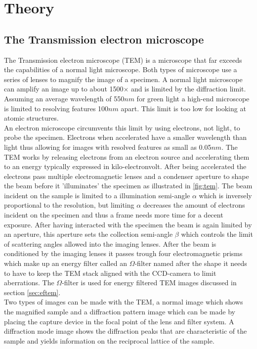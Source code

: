 \section{Theory}
\label{chap:theory}
\subsection{The Transmission electron microscope}
The Transmission electron microscope (TEM) is a microscope that far exceeds the capabilities of a normal light microscope. Both types of microscope use a series of lenses to magnify the image of a specimen.
A normal light microscope can amplify an image up to about 1500$\times$ and is limited by the diffraction limit. Assuming an average wavelength of 550$nm$ for green light a high-end microscope is limited to resolving features 100$nm$ apart.
This limit is too low for looking at atomic structures.\cite{PhysRevLett.106.193905}\\
An electron microscope circumvents this limit by using electrons, not light, to probe the specimen. Electrons when accelerated have a smaller wavelength than light thus allowing for images with resolved features as small as 0.05$nm$. \cite{kisielowski_freitag_bischoff_van}
The TEM works by releasing electrons from an electron source and accelerating them to an energy typically expressed in kilo-electronvolt. After being accelerated the electrons pass multiple electromagnetic lenses and a condenser aperture to shape the beam before it 'illuminates' the specimen as illustrated in \ref{fig:tem}.
The beam incident on the sample is limited to a illumination semi-angle $\alpha$ which is inversely proportional to the resolution, but limiting $\alpha$ decreases the amount of electrons incident on the specimen and thus a frame needs more time for a decent exposure.
After having interacted with the specimen the beam is again limited by an aperture, this aperture sets the collection semi-angle $\beta$ which controls the limit of scattering angles allowed into the imaging lenses.
After the beam is conditioned by the imaging lenses it passes trough four electromagnetic prisms which make up an energy filter called an $\Omega$-filter named after the shape it needs to have to keep the TEM stack aligned with the CCD-camera to limit aberrations.
The $\Omega$-filter is used for energy filtered TEM images discussed in section \ref{sec:eftem}.\\
Two types of images can be made with the TEM, a normal image which shows the magnified sample and a diffraction pattern image which can be made by placing the capture device in the focal point of the lens and filter system.
A diffraction mode image shows the diffraction peaks that are characteristic of the sample and yields information on the reciprocal lattice of the sample. \cite{Egerton_2008}


